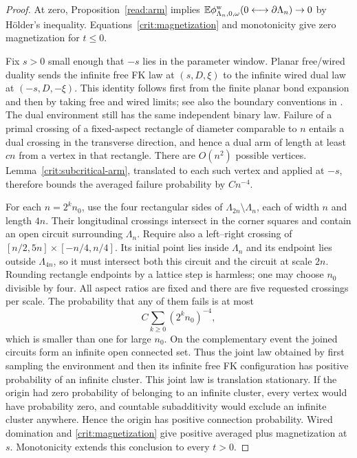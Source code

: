 \begin{proof}
At zero, Proposition~\ref{read:arm} implies
$\mathbb E\phi^{\mathrm w}_{\Lambda_n,0,\omega}
 (0\longleftrightarrow\partial\Lambda_n)\to0$ by H\"older's
inequality.  Equations~\eqref{crit:magnetization} and monotonicity give
zero magnetization for $t\le0$.

Fix $s>0$ small enough that $-s$ lies in the parameter window.  Planar
free/wired duality sends the infinite free FK law at $(s,D,\xi)$ to
the infinite wired dual law at $(-s,D,-\xi)$.  This identity follows
first from the finite planar bond expansion and then by taking free
and wired limits; see also the boundary conventions in
\cite[Section~2.5]{CDH2016}.  The dual environment still has the same
independent binary law.  Failure of a primal crossing of a
fixed-aspect rectangle of diameter comparable to $n$ entails a dual
crossing in the transverse direction, and hence a dual arm of length
at least $cn$ from a vertex in that rectangle.  There are $O(n^2)$
possible vertices.  Lemma~\ref{crit:subcritical-arm}, translated to
each such vertex and applied at $-s$, therefore bounds the averaged
failure probability by $Cn^{-4}$.

For each $n=2^kn_0$, use the four rectangular sides of
$\Lambda_{2n}\setminus\Lambda_n$, each of width $n$ and length $4n$.
Their longitudinal crossings intersect in the corner squares and
contain an open circuit surrounding $\Lambda_n$.  Require also a
left--right crossing of
$[n/2,5n]\times[-n/4,n/4]$.  Its initial point lies inside
$\Lambda_n$ and its endpoint lies outside $\Lambda_{4n}$, so it must
intersect both this circuit and the circuit at scale $2n$.  Rounding
rectangle endpoints by a lattice step is harmless; one may choose
$n_0$ divisible by four.  All aspect ratios are fixed and there are
five requested crossings per scale.  The probability that any of
them fails is at most
\[
 C\sum_{k\ge0}(2^kn_0)^{-4},
\]
which is smaller than one for large $n_0$.  On the complementary event
the joined circuits form an infinite open connected set.  Thus the
joint law obtained by first sampling the environment and then its
infinite free FK configuration has positive probability of an infinite
cluster.  This joint law is translation stationary.  If the origin
had zero probability of belonging to an infinite cluster, every
vertex would have probability zero, and countable subadditivity would
exclude an infinite cluster anywhere.  Hence the origin has positive
connection probability.  Wired domination and
\eqref{crit:magnetization} give positive averaged plus magnetization
at $s$.  Monotonicity extends this conclusion to every $t>0$.
\end{proof}

